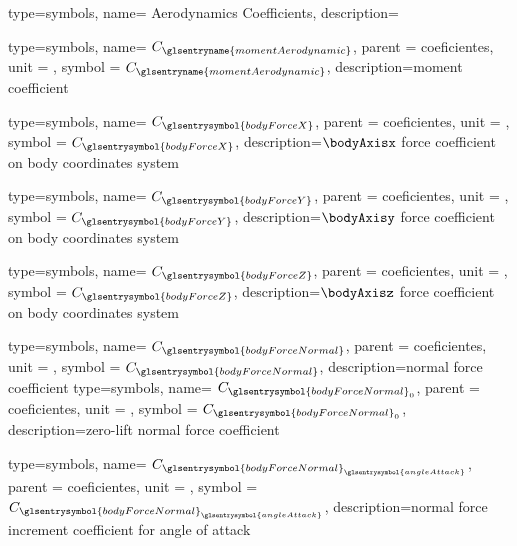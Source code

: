{type=symbols,
    name= {Aerodynamics Coefficients},
    description={}
}

{type=symbols,
    name= \ensuremath{C_{\glsentryname{momentAerodynamic}}},
    parent = {coeficientes},
    unit = \unexpanded{},
    symbol = \ensuremath{C_{\glsentryname{momentAerodynamic}}},
    description={moment coefficient}
}

{type=symbols,
    name= \ensuremath{C_{\glsentrysymbol{bodyForceX}}},
    parent = {coeficientes},
    unit = \unexpanded{},
    symbol = \ensuremath{C_{\glsentrysymbol{bodyForceX}}},
    description={$\bodyAxisx$ force coefficient on body coordinates system }
}

{type=symbols,
    name= \ensuremath{C_{\glsentrysymbol{bodyForceY}}},
    parent = {coeficientes},
    unit = \unexpanded{},
    symbol = \ensuremath{C_{\glsentrysymbol{bodyForceY}}},
    description={$\bodyAxisy$ force coefficient on body coordinates system }
}

{type=symbols,
    name= \ensuremath{C_{\glsentrysymbol{bodyForceZ}}},
    parent = {coeficientes},
    unit = \unexpanded{},
    symbol = \ensuremath{C_{\glsentrysymbol{bodyForceZ}}},
    description={$\bodyAxisz$ force coefficient on body coordinates system }
}

{type=symbols,
    name= \ensuremath{C_{\glsentrysymbol{bodyForceNormal}}},
    parent = {coeficientes},
    unit = \unexpanded{},
    symbol = \ensuremath{C_{\glsentrysymbol{bodyForceNormal}}},
    description={normal force coefficient}
}
{type=symbols,
    name= \ensuremath{C_{\glsentrysymbol{bodyForceNormal}_{0}}},
    parent = {coeficientes},
    unit = \unexpanded{},
    symbol = \ensuremath{C_{\glsentrysymbol{bodyForceNormal}_{0}}},
    description={zero-lift normal force coefficient}
}

{type=symbols,
    name= \ensuremath{C_{{\glsentrysymbol{bodyForceNormal}}_{\glsentrysymbol{angleAttack}}}},
    parent = {coeficientes},
    unit = \unexpanded{},
    symbol = \ensuremath{C_{{\glsentrysymbol{bodyForceNormal}}_{\glsentrysymbol{angleAttack}}}},
    description={normal force increment coefficient for angle of attack}
}

